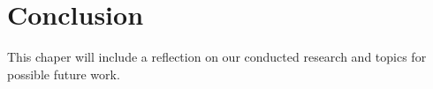 \chapter{Conclusion}
\label{chapter:conclusion}

This chaper will include a reflection on our conducted research and topics for
possible future work.
